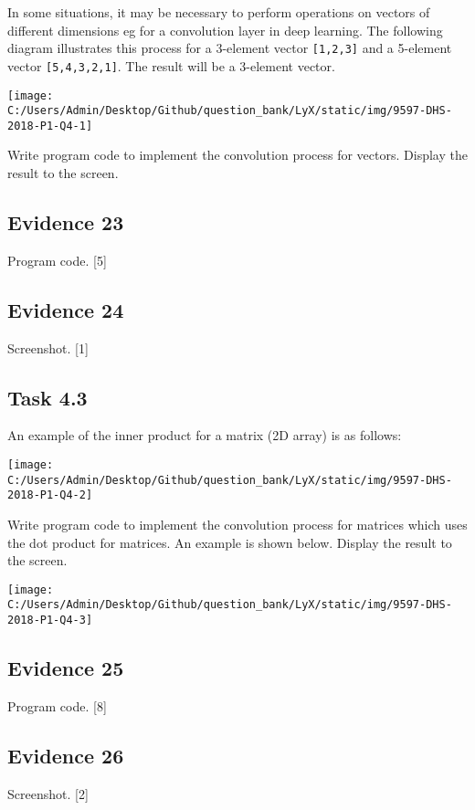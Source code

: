 In some situations, it may be necessary to perform operations on vectors
of different dimensions eg for a convolution layer in deep learning.
The following diagram illustrates this process for a 3-element vector
\texttt{{[}1,2,3{]}} and a 5-element vector \texttt{{[}5,4,3,2,1{]}}.
The result will be a 3-element vector.
\begin{center}
\texttt{[image: C:/Users/Admin/Desktop/Github/question\_bank/LyX/static/img/9597-DHS-2018-P1-Q4-1]}
\par\end{center}

Write program code to implement the convolution process for vectors.
Display the result to the screen.

\subsection*{Evidence 23 }

Program code. \hfill{}{[}5{]}

\subsection*{Evidence 24 }

Screenshot.\hfill{} {[}1{]}

\subsection*{Task 4.3 }

An example of the inner product for a matrix (2D array) is as follows:
\begin{center}
\texttt{[image: C:/Users/Admin/Desktop/Github/question\_bank/LyX/static/img/9597-DHS-2018-P1-Q4-2]}
\par\end{center}

Write program code to implement the convolution process for matrices
which uses the dot product for matrices. An example is shown below.
Display the result to the screen.
\begin{center}
\texttt{[image: C:/Users/Admin/Desktop/Github/question\_bank/LyX/static/img/9597-DHS-2018-P1-Q4-3]}
\par\end{center}

\subsection*{Evidence 25 }

Program code. \hfill{}{[}8{]}

\subsection*{Evidence 26}

Screenshot.\hfill{} {[}2{]}